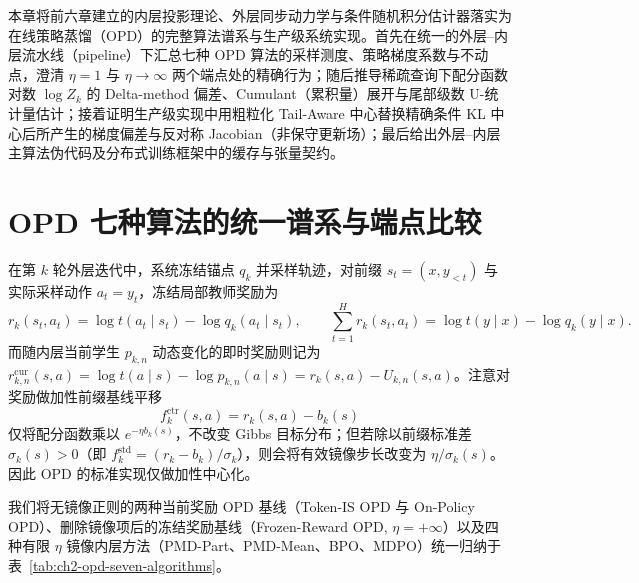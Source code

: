 \documentclass[lang=cn,scheme=chinese,openany]{elegantbook}
\begin{document}
本章将前六章建立的内层投影理论、外层同步动力学与条件随机积分估计器落实为在线策略蒸馏（OPD）的完整算法谱系与生产级系统实现。首先在统一的外层--内层流水线（pipeline）下汇总七种 OPD 算法的采样测度、策略梯度系数与不动点，澄清 $\eta=1$ 与 $\eta\to\infty$ 两个端点处的精确行为；随后推导稀疏查询下配分函数对数 $\log Z_k$ 的 Delta-method 偏差、Cumulant（累积量）展开与尾部级数 U-统计量估计；接着证明生产级实现中用粗粒化 Tail-Aware 中心替换精确条件 KL 中心后所产生的梯度偏差与反对称 Jacobian（非保守更新场）；最后给出外层--内层主算法伪代码及分布式训练框架中的缓存与张量契约。

\section{OPD 七种算法的统一谱系与端点比较}
\label{opd:mirror-origin}
\label{sec:ch2-opd-specialization}
\label{sec:ch2-opd-baselines}

在第 $k$ 轮外层迭代中，系统冻结锚点 $q_k$ 并采样轨迹，对前缀 $s_t=(x,y_{<t})$ 与实际采样动作 $a_t=y_t$，冻结局部教师奖励为
\begin{equation}
\label{eq:ch2-opd-raw-reward}
r_k(s_t,a_t)=\log t(a_t\mid s_t)-\log q_k(a_t\mid s_t),
\qquad
\sum_{t=1}^H r_k(s_t,a_t)=\log t(y\mid x)-\log q_k(y\mid x).
\end{equation}
而随内层当前学生 $p_{k,n}$ 动态变化的即时奖励则记为 $r_{k,n}^{\mathrm{cur}}(s,a)=\log t(a\mid s)-\log p_{k,n}(a\mid s)=r_k(s,a)-U_{k,n}(s,a)$。注意对奖励做加性前缀基线平移
\begin{equation}
\label{eq:ch2-opd-centered-reward}
f_k^{\mathrm{ctr}}(s,a)=r_k(s,a)-b_k(s)
\end{equation}
仅将配分函数乘以 $e^{-\eta b_k(s)}$，不改变 Gibbs 目标分布；但若除以前缀标准差 $\sigma_k(s)>0$（即 $f_k^{\mathrm{std}}=(r_k-b_k)/\sigma_k$），则会将有效镜像步长改变为 $\eta/\sigma_k(s)$。因此 OPD 的标准实现仅做加性中心化。

我们将无镜像正则的两种当前奖励 OPD 基线（Token-IS OPD 与 On-Policy OPD）、删除镜像项后的冻结奖励基线（Frozen-Reward OPD, $\eta=+\infty$）以及四种有限 $\eta$ 镜像内层方法（PMD-Part、PMD-Mean、BPO、MDPO）统一归纳于表~\ref{tab:ch2-opd-seven-algorithms}。
\end{document}
